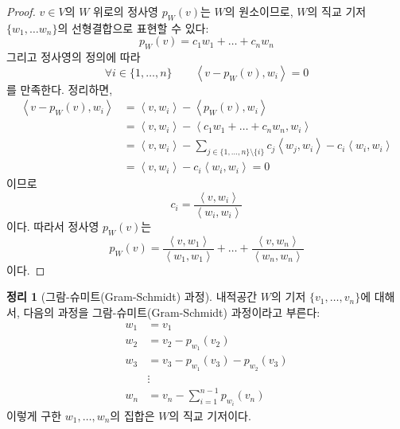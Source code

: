 \documentclass[unfonts,oneside,a4paper]{oblivoir}
\theoremstyle{definition}
\theoremstyle{theorem}
\newtheorem{theorem}[definition]{정리}
\theoremstyle{theorem}
\theoremstyle{remark}
\theoremstyle{remark}
\theoremstyle{remark}
\theoremstyle{remark}
\renewcommand{\vec}[1]{\bm{\mathit{#1}}}
\begin{document}
\begin{proof}
    $\vec v \in V$의 $W$ 위로의 정사영 $p_W (\vec v)$는 $W$의 원소이므로, $W$의 직교 기저 $\{\vec w_1, \dots \vec w_n\}$의 선형결합으로 표현할 수 있다:
    \begin{equation*}
        p_W (\vec v) = c_1 \vec w_1 + \dots + c_n \vec w_n
    \end{equation*}
    그리고 정사영의 정의에 따라
    \begin{equation*}
        \forall i \in \{1, \dots, n\} \qquad \left<\vec v - p_W (\vec v), \vec w_i\right> = 0
    \end{equation*}
    를 만족한다.
    정리하면,
    \begin{align*}
        \left<\vec v - p_W (\vec v), \vec w_i\right> &= \left<\vec v, \vec w_i\right> - \left<p_W (\vec v), \vec w_i\right>\\
                                                     &= \left<\vec v, \vec w_i \right> - \left<c_1 \vec w_1 + \dots + c_n \vec w_n, \vec w_i\right>\\
                                                     &= \left<\vec v, \vec w_i \right> - \sum_{j \in \{1, \dots, n\} \setminus \{i\}} c_j \left<\vec w_j, \vec w_i\right> - c_i \left<\vec w_i, \vec w_i\right>\\
                                                     &= \left<\vec v, \vec w_i \right> - c_i \left<\vec w_i, \vec w_i\right> = 0
    \end{align*}
    이므로
    \begin{equation*}
        c_i = \frac{\left<\vec v, \vec w_i\right>}{\left<\vec w_i, \vec w_i\right>}
    \end{equation*}
    이다.
    따라서 정사영 $p_W (\vec v)$는
    \begin{equation*}
        p_W (\vec v) = \frac{\left<\vec v, \vec w_1\right>}{\left<\vec w_1, \vec w_1\right>} + \dots + \frac{\left<\vec v, \vec w_n\right>}{\left<\vec w_n, \vec w_n\right>}
    \end{equation*}
    이다.
\end{proof}

\begin{theorem} [그람-슈미트(Gram-Schmidt) 과정]
    내적공간 $W$의 기저 $\{\vec v_1, \dots, \vec v_n\}$에 대해서, 다음의 과정을 그람-슈미트(Gram-Schmidt) 과정이라고 부른다:
    \begin{align*}
        \vec w_1 &= \vec v_1\\
        \vec w_2 &= \vec v_2 - p_{\vec w_1} (\vec v_2)\\
        \vec w_3 &= \vec v_3 - p_{\vec w_1} (\vec v_3) - p_{\vec w_2} (\vec v_3)\\
                 &\vdots\\
        \vec w_n &= \vec v_n - \sum_{i = 1}^{n - 1} p_{\vec w_i} (\vec v_n)
    \end{align*}
    이렇게 구한 $\vec w_1, \dots, \vec w_n$의 집합은 $W$의 직교 기저이다.
\end{theorem}
\end{document}
